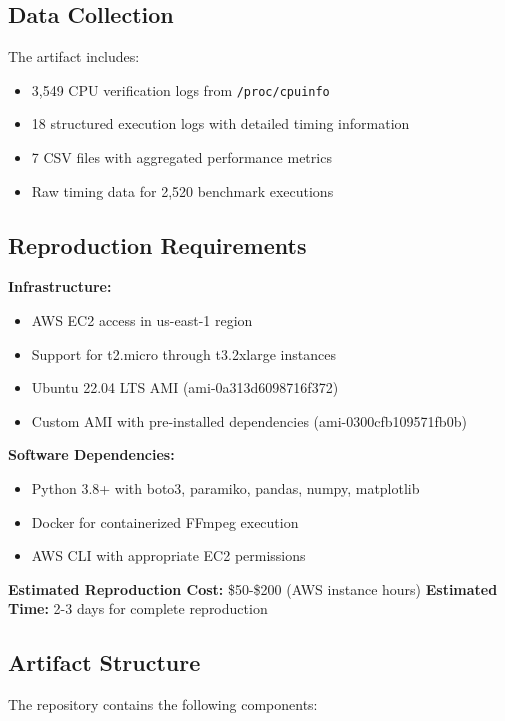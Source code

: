 \documentclass[conference]{IEEEtran}
\begin{document}
\subsection{Data Collection}

The artifact includes:

\begin{itemize}
	\item 3,549 CPU verification logs from \texttt{/proc/cpuinfo}
	\item 18 structured execution logs with detailed timing information
	\item 7 CSV files with aggregated performance metrics
	\item Raw timing data for 2,520 benchmark executions
\end{itemize}

\subsection{Reproduction Requirements}

\textbf{Infrastructure:}
\begin{itemize}
	\item AWS EC2 access in us-east-1 region
	\item Support for t2.micro through t3.2xlarge instances
	\item Ubuntu 22.04 LTS AMI (ami-0a313d6098716f372)
	\item Custom AMI with pre-installed dependencies (ami-0300cfb109571fb0b)
\end{itemize}

\textbf{Software Dependencies:}
\begin{itemize}
	\item Python 3.8+ with boto3, paramiko, pandas, numpy, matplotlib
	\item Docker for containerized FFmpeg execution
	\item AWS CLI with appropriate EC2 permissions
\end{itemize}

\textbf{Estimated Reproduction Cost:} \$50-\$200 (AWS instance hours)
\textbf{Estimated Time:} 2-3 days for complete reproduction


\subsection{Artifact Structure}

The repository contains the following components:
\end{document}
